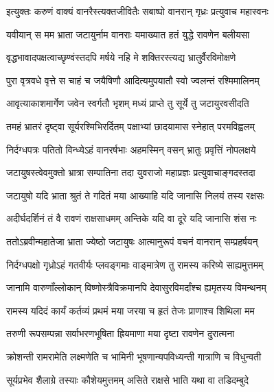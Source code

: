 
\twolineshloka
{इत्युक्तः करुणं वाक्यं वानरैस्त्यक्तजीवितैः}
{सबाष्पो वानरान् गृध्रः प्रत्युवाच महास्वनः} %

\twolineshloka
{यवीयान् स मम भ्राता जटायुर्नाम वानराः}
{यमाख्यात हतं युद्धे रावणेन बलीयसा} %

\twolineshloka
{वृद्धभावादपक्षत्वाच्छृण्वंस्तदपि मर्षये}
{नहि मे शक्तिरस्त्यद्य भ्रातुर्वैरविमोक्षणे} %

\twolineshloka
{पुरा वृत्रवधे वृत्ते स चाहं च जयैषिणौ}
{आदित्यमुपयातौ स्वो ज्वलन्तं रश्मिमालिनम्} %

\twolineshloka
{आवृत्याकाशमार्गेण जवेन स्वर्गतौ भृशम्}
{मध्यं प्राप्ते तु सूर्ये तु जटायुरवसीदति} %

\twolineshloka
{तमहं भ्रातरं दृष्ट्वा सूर्यरश्मिभिरर्दितम्}
{पक्षाभ्यां छादयामास स्नेहात् परमविह्वलम्} %

\twolineshloka
{निर्दग्धपत्रः पतितो विन्ध्येऽहं वानरर्षभाः}
{अहमस्मिन् वसन् भ्रातुः प्रवृत्तिं नोपलक्षये} %

\twolineshloka
{जटायुषस्त्वेवमुक्तो भ्रात्रा सम्पातिना तदा}
{युवराजो महाप्रज्ञः प्रत्युवाचाङ्गदस्तदा} %

\twolineshloka
{जटायुषो यदि भ्राता श्रुतं ते गदितं मया}
{आख्याहि यदि जानासि निलयं तस्य रक्षसः} %

\twolineshloka
{अदीर्घदर्शिनं तं वै रावणं राक्षसाधमम्}
{अन्तिके यदि वा दूरे यदि जानासि शंस नः} %

\twolineshloka
{ततोऽब्रवीन्महातेजा भ्राता ज्येष्ठो जटायुषः}
{आत्मानुरूपं वचनं वानरान् सम्प्रहर्षयन्} %

\twolineshloka
{निर्दग्धपक्षो गृध्रोऽहं गतवीर्यः प्लवङ्गमाः}
{वाङ्मात्रेण तु रामस्य करिष्ये साह्यमुत्तमम्} %

\twolineshloka
{जानामि वारुणाँल्लोकान् विष्णोस्त्रैविक्रमानपि}
{देवासुरविमर्दांश्च ह्यमृतस्य विमन्थनम्} %

\twolineshloka
{रामस्य यदिदं कार्यं कर्तव्यं प्रथमं मया}
{जरया च हृतं तेजः प्राणाश्च शिथिला मम} %

\twolineshloka
{तरुणी रूपसम्पन्ना सर्वाभरणभूषिता}
{ह्रियमाणा मया दृष्टा रावणेन दुरात्मना} %

\twolineshloka
{क्रोशन्ती रामरामेति लक्ष्मणेति च भामिनी}
{भूषणान्यपविध्यन्ती गात्राणि च विधुन्वती} %

\twolineshloka
{सूर्यप्रभेव शैलाग्रे तस्याः कौशेयमुत्तमम्}
{असिते राक्षसे भाति यथा वा तडिदम्बुदे} %

